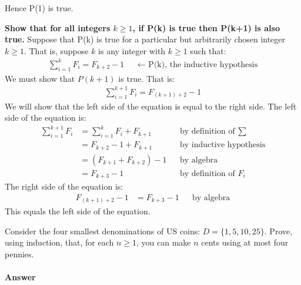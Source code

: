 \documentclass{article}
\begin{document}
Hence P(1) is true.

\textbf{Show that for all integers $k \geq 1$, if P(k) is true then P(k+1) is also true.} \newline
Suppose that P(k) is true for a particular but arbitrarily chosen integer $k \geq 1$. That is, suppose $k$ is any integer with $k \geq 1$ such that: 
\begin{align}
        \nonumber \sum_{i=1}^k F_i = F_{k+2}-1 &&\text{$\leftarrow$ P(k), the inductive hypothesis}
\end{align}
We must show that $P(k+1)$ is true. That is:
\begin{align}
        \nonumber \sum_{i=1}^{k+1} F_i = F_{(k+1)+2}-1
\end{align}
We will show that the left side of the equation is equal to the right side. The left side of the equation is:
\begin{align}
        \nonumber \sum_{i=1}^{k+1} F_i & = \sum_{i=1}^{k} F_i + F_{k+1} &&\text{by definition of $\sum$} \\
        \nonumber &= F_{k+2} - 1 + F_{k+1} &&\text{by inductive hypothesis} \\
        \nonumber &= (F_{k+1} + F_{k+2}) - 1 &&\text{by algebra} \\
        \nonumber &= F_{k+3} - 1 &&\text{by definition of $F_i$}
\end{align}
The right side of the equation is:
\begin{align}
        \nonumber F_{(k+1)+2}-1 & = F_{k+3} - 1 &&\text{by algebra}
\end{align}
This equals the left side of the equation.  

\collab{} 

Consider the four smallest denominations of US coins: $D=\{1,5,10,25\}$.  Prove, using
induction, that, for each $n \geq 1$, you can make $n$ cents using at most four
pennies.

\paragraph{Answer}
\end{document}

